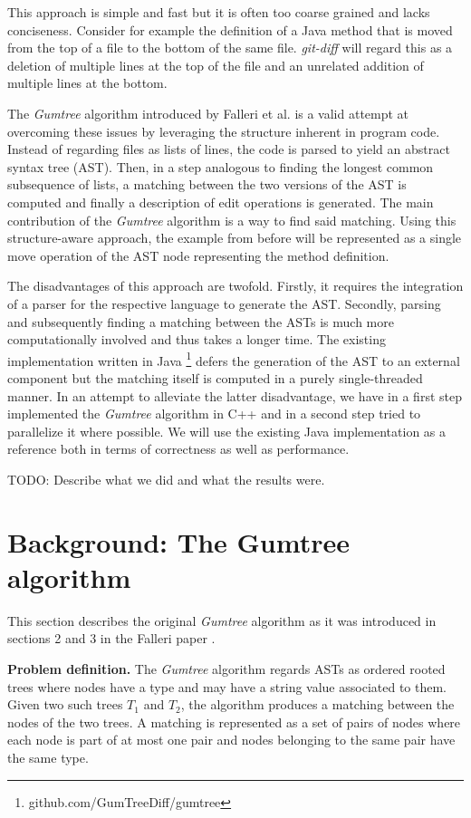 \documentclass[letterpaper]{article}
\newcommand{\mypar}[1]{{\bf #1.}}
\begin{document}
This approach is simple and fast but it is often too coarse grained and lacks conciseness.
Consider for example the definition of a Java method that is moved from the top of a file to the bottom of the same file.
\emph{git-diff} will regard this as a deletion of multiple lines at the top of the file and an unrelated addition of multiple lines at the bottom.

The \emph{Gumtree} algorithm introduced by Falleri et al. \cite{falleri:2014:structure_diff} is a valid attempt at overcoming these issues by leveraging the structure inherent in program code.
Instead of regarding files as lists of lines, the code is parsed to yield an abstract syntax tree (AST).
Then, in a step analogous to finding the longest common subsequence of lists, a matching between the two versions of the AST is computed and finally a description of edit operations is generated.
The main contribution of the \emph{Gumtree} algorithm is a way to find said matching.
Using this structure-aware approach, the example from before will be represented as a single move operation of the AST node representing the method definition.

The disadvantages of this approach are twofold.
Firstly, it requires the integration of a parser for the respective language to generate the AST.
Secondly, parsing and subsequently finding a matching between the ASTs is much more computationally involved and thus takes a longer time.
The existing implementation written in Java \footnote{github.com/GumTreeDiff/gumtree} defers the generation of the AST to an external component but the matching itself is computed in a purely single-threaded manner.
In an attempt to alleviate the latter disadvantage, we have in a first step implemented the \emph{Gumtree} algorithm in C++ and in a second step tried to parallelize it where possible.
We will use the existing Java implementation as a reference both in terms of correctness as well as performance.

TODO: Describe what we did and what the results were.

\section{Background: The Gumtree algorithm}\label{sec:background}

This section describes the original \emph{Gumtree} algorithm as it was introduced in sections 2 and 3 in the Falleri paper \cite{falleri:2014:structure_diff}.

\mypar{Problem definition}
The \emph{Gumtree} algorithm regards ASTs as ordered rooted trees where nodes have a type and may have a string value associated to them.
Given two such trees $T_1$ and $T_2$, the algorithm produces a matching between the nodes of the two trees.
A matching is represented as a set of pairs of nodes where each node is part of at most one pair and nodes belonging to the same pair have the same type.
\end{document}
